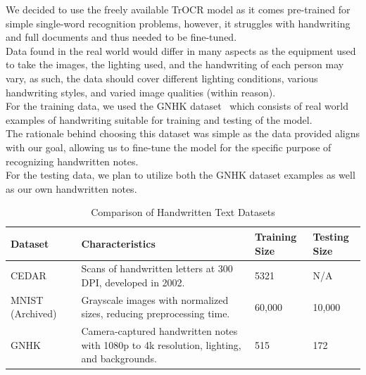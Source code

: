 \documentclass[twoside,a4paper]{article}
\begin{document}
We decided to use the freely available TrOCR model as it comes pre-trained for simple single-word recognition problems, however, it struggles with handwriting and full documents and thus needed to be fine-tuned.\\
Data found in the real world would differ in many aspects as the equipment used to take the images, the lighting used, and the handwriting of each person may vary, as such, the data should cover different lighting conditions, various handwriting styles, and varied image qualities (within reason). \\
For the training data, we used the GNHK dataset~\cite{Lee2021} which consists of real world examples of handwriting suitable for training and testing of the model. \\
The rationale behind choosing this dataset was simple as the data provided aligns with our goal, allowing us to fine-tune the model for the specific purpose of recognizing handwritten notes.\\
For the testing data, we plan to utilize both the GNHK dataset examples as well as our own handwritten notes.
\newpage
\begin{table}[!ht]
    \centering
    
    \caption{Comparison of Handwritten Text Datasets}
    \renewcommand{\arraystretch}{1.3} %
    \begin{tabular}{|p{3cm}|p{5cm}|p{2.5cm}|p{2.5cm}|}
    \hline
        \textbf{Dataset} & \textbf{Characteristics} & \textbf{Training Size} & \textbf{Testing Size} \\ \hline
        CEDAR~\cite{CEDAR_Dataset} & Scans of handwritten letters at 300 DPI, developed in 2002. & 5321 & N/A \\ \hline
        MNIST (Archived)~\cite{MNIST_Dataset} & Grayscale images with normalized sizes, reducing preprocessing time. & 60,000 & 10,000 \\ \hline
        GNHK~\cite{Lee2021} & Camera-captured handwritten notes with 1080p to 4k resolution, lighting, and backgrounds. & 515 & 172 \\ \hline
    \end{tabular}
    \label{tab:datasets}
\end{table}
\end{document}
